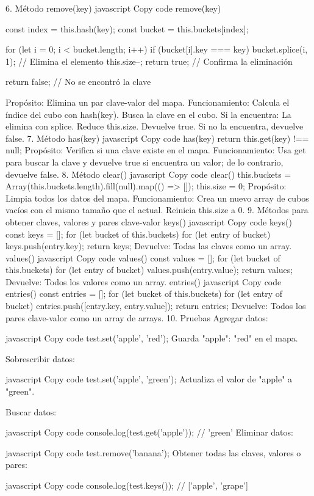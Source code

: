 6. Método remove(key)
javascript
Copy code
remove(key) {
  const index = this.hash(key);
  const bucket = this.buckets[index];

  for (let i = 0; i < bucket.length; i++) {
    if (bucket[i].key === key) {
      bucket.splice(i, 1); // Elimina el elemento
      this.size--;
      return true; // Confirma la eliminación
    }
  }

  return false; // No se encontró la clave
}
Propósito: Elimina un par clave-valor del mapa.
Funcionamiento:
Calcula el índice del cubo con hash(key).
Busca la clave en el cubo.
Si la encuentra:
La elimina con splice.
Reduce this.size.
Devuelve true.
Si no la encuentra, devuelve false.
7. Método has(key)
javascript
Copy code
has(key) {
  return this.get(key) !== null;
}
Propósito: Verifica si una clave existe en el mapa.
Funcionamiento: Usa get para buscar la clave y devuelve true si encuentra un valor; de lo contrario, devuelve false.
8. Método clear()
javascript
Copy code
clear() {
  this.buckets = Array(this.buckets.length).fill(null).map(() => []);
  this.size = 0;
}
Propósito: Limpia todos los datos del mapa.
Funcionamiento:
Crea un nuevo array de cubos vacíos con el mismo tamaño que el actual.
Reinicia this.size a 0.
9. Métodos para obtener claves, valores y pares clave-valor
keys()
javascript
Copy code
keys() {
  const keys = [];
  for (let bucket of this.buckets) {
    for (let entry of bucket) {
      keys.push(entry.key);
    }
  }
  return keys;
}
Devuelve: Todas las claves como un array.
values()
javascript
Copy code
values() {
  const values = [];
  for (let bucket of this.buckets) {
    for (let entry of bucket) {
      values.push(entry.value);
    }
  }
  return values;
}
Devuelve: Todos los valores como un array.
entries()
javascript
Copy code
entries() {
  const entries = [];
  for (let bucket of this.buckets) {
    for (let entry of bucket) {
      entries.push([entry.key, entry.value]);
    }
  }
  return entries;
}
Devuelve: Todos los pares clave-valor como un array de arrays.
10. Pruebas
Agregar datos:

javascript
Copy code
test.set('apple', 'red');
Guarda "apple": "red" en el mapa.

Sobrescribir datos:

javascript
Copy code
test.set('apple', 'green');
Actualiza el valor de "apple" a "green".

Buscar datos:

javascript
Copy code
console.log(test.get('apple')); // 'green'
Eliminar datos:

javascript
Copy code
test.remove('banana');
Obtener todas las claves, valores o pares:

javascript
Copy code
console.log(test.keys()); // ['apple', 'grape']